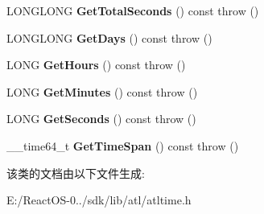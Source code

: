 \begin{DoxyCompactItemize}
\item 
\mbox{\label{class_a_t_l_1_1_c_time_span_a06ee6c59a2cbd6308303414363905c79}} 
L\+O\+N\+G\+L\+O\+NG {\bfseries Get\+Total\+Seconds} () const  throw ()
\item 
\mbox{\label{class_a_t_l_1_1_c_time_span_ac167208b8944c769b693d06ebf2fbf5d}} 
L\+O\+N\+G\+L\+O\+NG {\bfseries Get\+Days} () const  throw ()
\item 
\mbox{\label{class_a_t_l_1_1_c_time_span_acd0d57e7cbf0c9e9f861ff5d48a79899}} 
L\+O\+NG {\bfseries Get\+Hours} () const  throw ()
\item 
\mbox{\label{class_a_t_l_1_1_c_time_span_a2e65856474d313f83043bfd51fa7e145}} 
L\+O\+NG {\bfseries Get\+Minutes} () const  throw ()
\item 
\mbox{\label{class_a_t_l_1_1_c_time_span_ab544190087462574d436a8300e14cc3f}} 
L\+O\+NG {\bfseries Get\+Seconds} () const  throw ()
\item 
\mbox{\label{class_a_t_l_1_1_c_time_span_ab1daaeb8e29ef1b14210b2571d371b59}} 
\+\_\+\+\_\+time64\+\_\+t {\bfseries Get\+Time\+Span} () const  throw ()
\end{DoxyCompactItemize}


该类的文档由以下文件生成\+:\begin{DoxyCompactItemize}
\item 
E\+:/\+React\+O\+S-\/0../sdk/lib/atl/atltime.\+h\end{DoxyCompactItemize}
